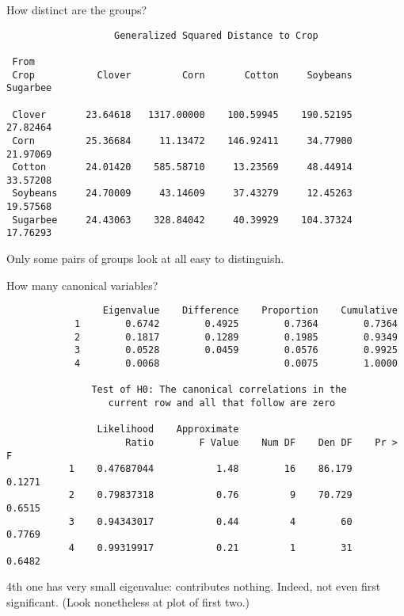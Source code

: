 \documentclass[pdf]{prosper}
\begin{document}
\begin{slide}{How distinct are the groups?}
  
{\scriptsize
\begin{verbatim}
                   Generalized Squared Distance to Crop
 
 From
 Crop           Clover         Corn       Cotton     Soybeans     Sugarbee

 Clover       23.64618   1317.00000    100.59945    190.52195     27.82464
 Corn         25.36684     11.13472    146.92411     34.77900     21.97069
 Cotton       24.01420    585.58710     13.23569     48.44914     33.57208
 Soybeans     24.70009     43.14609     37.43279     12.45263     19.57568
 Sugarbee     24.43063    328.84042     40.39929    104.37324     17.76293
\end{verbatim}
}

Only some pairs of groups look at all easy to distinguish.


\end{slide}

\begin{slide}{How many canonical variables?}

{\scriptsize
\begin{verbatim}
                 Eigenvalue    Difference    Proportion    Cumulative
            1        0.6742        0.4925        0.7364        0.7364
            2        0.1817        0.1289        0.1985        0.9349
            3        0.0528        0.0459        0.0576        0.9925
            4        0.0068                      0.0075        1.0000

               Test of H0: The canonical correlations in the
                  current row and all that follow are zero
 
                Likelihood    Approximate
                     Ratio        F Value    Num DF    Den DF    Pr > F
           1    0.47687044           1.48        16    86.179    0.1271
           2    0.79837318           0.76         9    70.729    0.6515
           3    0.94343017           0.44         4        60    0.7769
           4    0.99319917           0.21         1        31    0.6482

\end{verbatim}
}

4th one has very small eigenvalue: contributes nothing. Indeed, not even first significant. (Look nonetheless at plot of first two.)
  
\end{slide}
\end{document}
